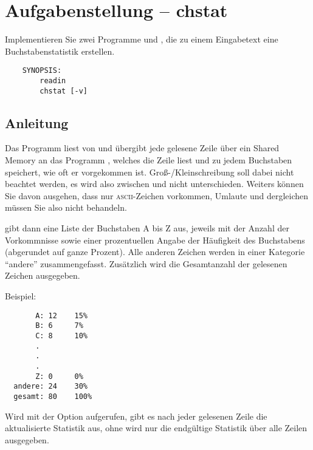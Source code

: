 




\section*{Aufgabenstellung -- chstat}

Implementieren Sie zwei Programme  und , die
zu einem Eingabetext eine Buchstabenstatistik erstellen.

\begin{verbatim}
    SYNOPSIS:
        readin
        chstat [-v]
\end{verbatim}

\subsection*{Anleitung}

Das Programm  liest von  und übergibt jede
gelesene Zeile über ein Shared Memory an das Programm , welches
die Zeile liest und zu jedem Buchstaben speichert, wie oft er vorgekommen ist.
Groß-/Kleinschreibung soll dabei nicht beachtet werden, es wird also zwischen
 und  nicht unterschieden. Weiters können Sie davon
ausgehen, dass nur \textsc{ascii}-Zeichen vorkommen, Umlaute und dergleichen
müssen Sie also nicht behandeln.

 gibt dann eine Liste der Buchstaben A bis Z aus, jeweils mit
der Anzahl der Vorkommnisse sowie einer prozentuellen Angabe der Häufigkeit des
Buchstabens (abgerundet auf ganze Prozent). Alle anderen Zeichen werden in einer
Kategorie "`andere"' zusammengefasst. Zusätzlich wird die Gesamtanzahl der
gelesenen Zeichen ausgegeben.

Beispiel:
\begin{verbatim}
       A: 12    15%
       B: 6     7%
       C: 8     10%
       .
       .
       .
       Z: 0     0%
  andere: 24    30%
  gesamt: 80    100%
\end{verbatim}

Wird  mit der Option  aufgerufen, gibt es nach
jeder gelesenen Zeile die aktualisierte Statistik aus, ohne  wird
nur die endgültige Statistik über alle Zeilen ausgegeben.

